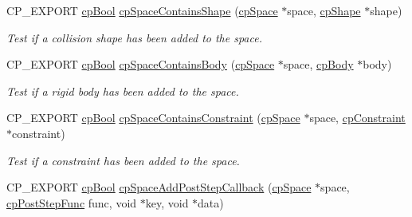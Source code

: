 \begin{DoxyCompactItemize}
\mbox{\label{group__cpSpace_ga1c3d88fb51ede38bc5e84f31518d0a83}} 
C\+P\+\_\+\+E\+X\+P\+O\+RT \hyperlink{group__basicTypes_gabc5e752c48f3449ca26ef413ecbd647e}{cp\+Bool} \hyperlink{group__cpSpace_ga1c3d88fb51ede38bc5e84f31518d0a83}{cp\+Space\+Contains\+Shape} (\hyperlink{structcpSpace}{cp\+Space} $\ast$space, \hyperlink{structcpShape}{cp\+Shape} $\ast$shape)
\begin{DoxyCompactList}\small\item\em Test if a collision shape has been added to the space. \end{DoxyCompactList}\item 
\mbox{\label{group__cpSpace_ga7d240d6dd4742b465590f60909681862}} 
C\+P\+\_\+\+E\+X\+P\+O\+RT \hyperlink{group__basicTypes_gabc5e752c48f3449ca26ef413ecbd647e}{cp\+Bool} \hyperlink{group__cpSpace_ga7d240d6dd4742b465590f60909681862}{cp\+Space\+Contains\+Body} (\hyperlink{structcpSpace}{cp\+Space} $\ast$space, \hyperlink{structcpBody}{cp\+Body} $\ast$body)
\begin{DoxyCompactList}\small\item\em Test if a rigid body has been added to the space. \end{DoxyCompactList}\item 
\mbox{\label{group__cpSpace_gaf49f0495a0e0fda2dc76ae66c3bc637a}} 
C\+P\+\_\+\+E\+X\+P\+O\+RT \hyperlink{group__basicTypes_gabc5e752c48f3449ca26ef413ecbd647e}{cp\+Bool} \hyperlink{group__cpSpace_gaf49f0495a0e0fda2dc76ae66c3bc637a}{cp\+Space\+Contains\+Constraint} (\hyperlink{structcpSpace}{cp\+Space} $\ast$space, \hyperlink{structcpConstraint}{cp\+Constraint} $\ast$constraint)
\begin{DoxyCompactList}\small\item\em Test if a constraint has been added to the space. \end{DoxyCompactList}\item 
C\+P\+\_\+\+E\+X\+P\+O\+RT \hyperlink{group__basicTypes_gabc5e752c48f3449ca26ef413ecbd647e}{cp\+Bool} \hyperlink{group__cpSpace_ga6fbf3c0722a5618ded1ed7371cbebcb3}{cp\+Space\+Add\+Post\+Step\+Callback} (\hyperlink{structcpSpace}{cp\+Space} $\ast$space, \hyperlink{group__cpSpace_ga93e9005e387fec86eeb4a225ac295a23}{cp\+Post\+Step\+Func} func, void $\ast$key, void $\ast$data)
\item 
\mbox{\label{group__cpSpace_ga62eea2b00f5503976ef250a33d4c474a}} 

\end{DoxyCompactItemize}
